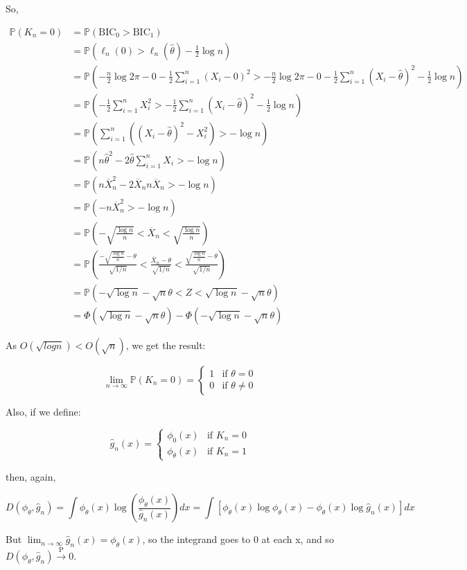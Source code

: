 So,

\begin{align*}
\mathbb{P}(K_{n} = 0) &= \mathbb{P}(\text{BIC}_{0} > \text{BIC}_{1}) \\
&= \mathbb{P}\left(\ell_{n}(0) > \ell_{n}(\hat{\theta}) - \frac{1}{2} \log n \right) \\
&= \mathbb{P} \left(-\frac{n}{2} \log 2\pi - 0 - \frac{1}{2} \sum_{i=1}^{n} (X_{i} - 0)^{2} > -\frac{n}{2} \log 2\pi - 0 - \frac{1}{2} \sum_{i=1}^{n} (X_{i} - \hat{\theta})^{2} - \frac{1}{2} \log n \right) \\
&= \mathbb{P}\left( -\frac{1}{2} \sum_{i=1}^{n} X_{i}^{2} > -\frac{1}{2} \sum_{i=1}^{n} (X_{i} - \hat{\theta})^{2} - \frac{1}{2} \log n\right) \\
&= \mathbb{P}\left( \sum_{i=1}^{n} \left((X_{i} - \hat{\theta})^{2} - X_{i}^{2} \right) > -\log n \right) \\
&= \mathbb{P}\left( n \hat{\theta}^{2} - 2 \hat{\theta} \sum_{i=1}^{n} X_{i} > -\log n \right) \\
&= \mathbb{P}\left( n \overline{X}_{n}^{2} - 2 \overline{X}_{n} n \overline{X}_{n} > -\log n\right) \\
&= \mathbb{P}\left( -n \overline{X}_{n}^{2} > -\log n \right) \\
&= \mathbb{P}\left(-\sqrt{\frac{\log n}{n}} < \overline{X}_{n} < \sqrt{\frac{\log n}{n}} \right) \\
&= \mathbb{P}\left(\frac{-\sqrt{\frac{\log n}{n}} - \theta}{\sqrt{1/n}} < \frac{\overline{X}_{n} - \theta}{\sqrt{1/n}} < \frac{\sqrt{\frac{\log n}{n}} - \theta}{\sqrt{1/n}} \right) \\ 
&=  \mathbb{P}\left(-\sqrt{\log n} - \sqrt{n}\theta < Z < \sqrt{\log n} - \sqrt{n}\theta \right) \\
&= \Phi(\sqrt{\log n} - \sqrt{n}\theta) - \Phi(-\sqrt{\log n} - \sqrt{n}\theta)
\end{align*}

As \(O(\sqrt{log n}) < O(\sqrt{n})\), we get the result:

\[ \lim_{n \rightarrow \infty} \mathbb{P}(K_{n} = 0) = \begin{cases}
1 & \text{if } \theta = 0 \\
0 & \text{if } \theta \neq 0
\end{cases}\]

Also, if we define:

\[
\hat{g}_{n}(x) = 
\begin{cases}
\phi_{0}(x) & \text{if } K_{n} = 0 \\
\phi_{\overline{\theta}}(x) & \text{if } K_{n} = 1
\end{cases}
\]

then, again,

\[ D(\phi_\theta, \hat{g}_{n}) = \int \phi_\theta(x) \log \left(\frac{\phi_\theta(x)}{\hat{g}_{n}(x)} \right) dx = \int \left[\phi_\theta(x) \log \phi_\theta(x) - \phi_\theta(x) \log \hat{g}_{n}(x) \right] dx \]

But \(\lim_{n \rightarrow \infty} \hat{g}_{n}(x) = \phi_\theta(x)\), so
the integrand goes to 0 at each x, and so
\(D(\phi_\theta, \hat{g}_{n}) \xrightarrow{\text{P}} 0\).
